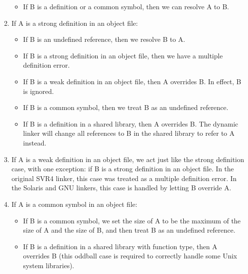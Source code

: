 \begin{enumerate}
\begin{itemize}
            \item If B is a definition or a common symbol, then we can resolve
                  A to B.
        \end{itemize}

    \item If A is a strong definition in an object file:

        \begin{itemize}
            \item If B is an undefined reference, then we resolve B to A.

            \item If B is a strong definition in an object file, then we have a
                  multiple definition error.

            \item If B is a weak definition in an object file, then A overrides
                  B.  In effect, B is ignored.

            \item If B is a common symbol, then we treat B as an undefined
                  reference.

            \item If B is a definition in a shared library, then A overrides B.
                  The dynamic linker will change all references to B in the
                  shared library to refer to A instead.
        \end{itemize}

    \item If A is a weak definition in an object file, we act just like the
          strong definition case, with one exception: if B is a strong
          definition in an object file.  In the original SVR4 linker, this case
          was treated as a multiple definition error.  In the Solaris and GNU
          linkers, this case is handled by letting B override A.

    \item If A is a common symbol in an object file:

        \begin{itemize}
            \item If B is a common symbol, we set the size of A to be the
                  maximum of the size of A and the size of B, and then treat B
                  as an undefined reference.

            \item If B is a definition in a shared library with function type,
                  then A overrides B (this oddball case is required to
                  correctly handle some Unix system libraries).


\end{itemize}
\end{enumerate}
